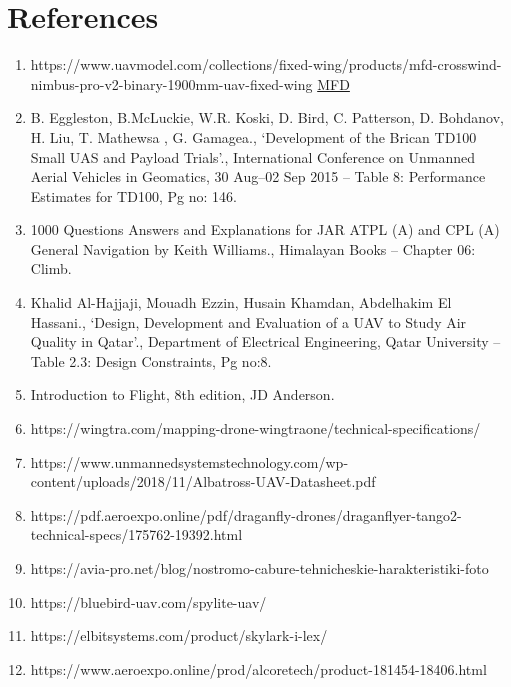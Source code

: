 \documentclass[12 pt]{article}
\begin{document}
\section{References}
\begin{enumerate}
    \item \label{MFD} https://www.uavmodel.com/collections/fixed-wing/products/mfd-crosswind-nimbus-pro-v2-binary-1900mm-uav-fixed-wing \href{https://www.uavmodel.com/collections/fixed-wing/products/mfd-crosswind-nimbus-pro-v2-binary-1900mm-uav-fixed-wing}{MFD}
    \item \label{Development of the Brican TD100 Small UAS and Payload Trials} B. Eggleston, B.McLuckie, W.R. Koski, D. Bird, C. Patterson, D. Bohdanov, H. Liu, T. Mathewsa , G. Gamagea., ‘Development of the Brican TD100 Small UAS and Payload Trials’., International Conference on Unmanned Aerial Vehicles in Geomatics, 30 Aug–02 Sep 2015 – Table 8: Performance Estimates for TD100, Pg no: 146.
    \item \label{3} 1000 Questions Answers and Explanations for JAR ATPL (A) and CPL (A) General Navigation by Keith Williams., Himalayan Books – Chapter 06: Climb.
    \item \label{4} Khalid Al-Hajjaji, Mouadh Ezzin, Husain Khamdan, Abdelhakim El Hassani., ‘Design, Development and Evaluation of a UAV to Study Air Quality in Qatar’., Department of Electrical Engineering, Qatar University – Table 2.3: Design Constraints, Pg no:8.
    \item \label{5} Introduction to Flight, 8th edition, JD Anderson.
    \item \label{6} https://wingtra.com/mapping-drone-wingtraone/technical-specifications/
    \item \label{7} https://www.unmannedsystemstechnology.com/wp-content/uploads/2018/11/Albatross-UAV-Datasheet.pdf
    \item \label{8} https://pdf.aeroexpo.online/pdf/draganfly-drones/draganflyer-tango2-technical-specs/175762-19392.html
    \item \label{9} https://avia-pro.net/blog/nostromo-cabure-tehnicheskie-harakteristiki-foto
    \item \label{10} https://bluebird-uav.com/spylite-uav/
    \item \label{11} https://elbitsystems.com/product/skylark-i-lex/
    \item \label{12} https://www.aeroexpo.online/prod/alcoretech/product-181454-18406.html
\end{enumerate}
\end{document}
